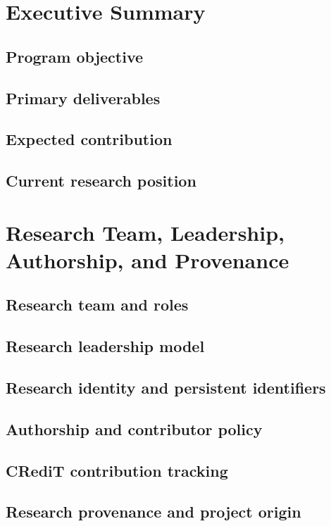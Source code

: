 \documentclass[11pt,journal,onecolumn,draftclsnofoot]{IEEEtran}
\begin{document}
\section{Executive Summary}
\subsection{Program objective}
\subsection{Primary deliverables}
\subsection{Expected contribution}
\subsection{Current research position}

\section{Research Team, Leadership, Authorship, and Provenance}
\subsection{Research team and roles}
\subsection{Research leadership model}
\subsection{Research identity and persistent identifiers}
\subsection{Authorship and contributor policy}
\subsection{CRediT contribution tracking}
\subsection{Research provenance and project origin}
\end{document}
